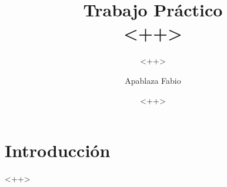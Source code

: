 \documentclass{beamer}
\title[<++>]{Trabajo Práctico\\ <++>}
\subtitle{<++>}
\author{Apablaza Fabio}
\institute{Universidad Nacional del Comahue}
\date{<++>}
\begin{document}
\begin{frame}
	\titlepage
\end{frame}

\begin{frame}
	\tableofcontents
\end{frame}

\section{Introducción}
\begin{frame}
<++>
\end{frame}
\end{document}
